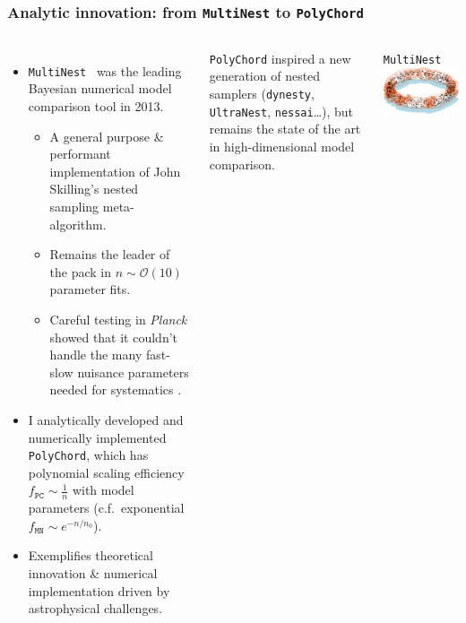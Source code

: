 \documentclass[aspectratio=169]{beamer}
\begin{document}
\begin{frame}
    \frametitle{Analytic innovation: from \texttt{MultiNest} to \texttt{PolyChord}}
    \begin{columns}
        \begin{itemize}
            \item \texttt{MultiNest}~ was the leading Bayesian numerical model comparison tool in 2013.
                \begin{itemize}
                    \item A general purpose \& performant implementation of John Skilling's nested sampling meta-algorithm.
                    \item Remains the leader of the pack in $n\sim\mathcal{O}(10)$ parameter fits.
                    \item Careful testing in \textit{Planck} showed that it couldn't handle the many fast-slow nuisance parameters needed for systematics .
                \end{itemize}
            \item I analytically developed and numerically implemented \texttt{PolyChord}, which has polynomial scaling efficiency $f_{\texttt{PC}}\sim \frac{1}{n}$ with model parameters (c.f.\ exponential $f_{\texttt{MN}}\sim e^{-n/n_0}$).
            \item Exemplifies theoretical innovation \& numerical implementation driven by astrophysical challenges.
        \end{itemize}
        \texttt{PolyChord} inspired a new generation of nested samplers (\texttt{dynesty}, \texttt{UltraNest}, \texttt{nessai}\ldots), but remains the state of the art in high-dimensional model comparison.
        \vspace{-10pt}
        \begin{block}{\texttt{MultiNest}~}
            \includegraphics[width=\textwidth]{figures/multinest.pdf}

\end{block}
\end{columns}
\end{frame}
\end{document}
